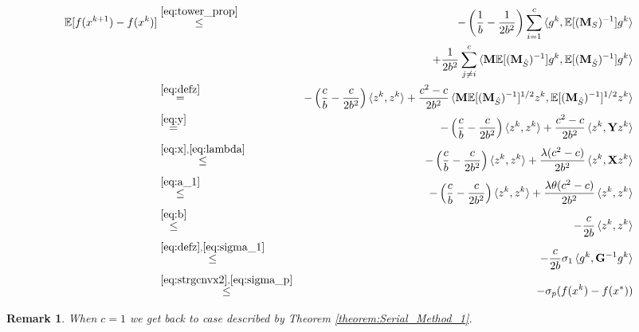 \documentclass[11pt]{article}
\newtheorem{remark}{Remark}
\begin{document}
		\begin{eqnarray}
			\mathbb{E}[f(x^{k+1})-f(x^k)] &\stackrel{\eqref{eq:tower_prop}}\leq & -\left(\frac{1}{b}-\frac{1}{2b^2}\right)\sum_{i=1}^{c}\braket{g^k,\mathbb{E}[(\mathbf{M}_{S})^{-1}
				] g^k} \\ && + \frac{1}{2b^2}\sum_{j\neq i}^{c}\braket{\mathbf{M}\mathbb{E}[(\mathbf{M}_{\hat{S}})^{-1}]g^k,\mathbb{E}[(\mathbf{M}_{\hat{S}})^{-1}
				] g^k} \\
			& \stackrel{\eqref{eq:defz}}= & -\left(\frac{c}{b}-\frac{c}{2b^2}\right)\braket{z^k,z^k}  + \frac{c^2-c}{2b^2}\braket{\mathbf{M}\mathbb{E}[(\mathbf{M}_{\hat{S}})^{-1}]^{1/2} z^k,\mathbb{E}[(\mathbf{M}_{\hat{S}})^{-1}
				]^{1/2} z^k} \notag \\ & \stackrel{\eqref{eq:y}} =  &-\left(\frac{c}{b}-\frac{c}{2b^2}\right)\braket{z^k,z^k}  + \frac{c^2-c}{2b^2}\braket{ z^k,\mathbf{Y} z^k} 
			\\ & \stackrel{\eqref{eq:x},\eqref{eq:lambda}} \leq &-\left(\frac{c}{b}-\frac{c}{2b^2}\right)\braket{z^k,z^k}  + \frac{\lambda(c^2-c)}{2b^2}\braket{ z^k,\mathbf{X} z^k} 
			\\ & \stackrel{\eqref{eq:a_1}} \leq &-\left(\frac{c}{b}-\frac{c}{2b^2}\right)\braket{z^k,z^k}  + \frac{\lambda \theta (c^2-c)}{2b^2}\braket{ z^k, z^k}
			\\ & \stackrel{\eqref{eq:b}} \leq &-\frac{c}{2b}\braket{ z^k, z^k} \label{eq:neededforproof}
			\\ & \stackrel{\eqref{eq:defz},\eqref{eq:sigma_1}} \leq &-\frac{c}{2b} \sigma_1 \braket{ g^k, \mathbf{G}^{-1} g^k}
			\\ & \stackrel{\eqref{eq:strgcnvx2},\eqref{eq:sigma_p}}\leq & -\sigma_p(f(x^k)-f(x^*))
		\end{eqnarray}

	
	
	
	\begin{remark}
		When $c=1$ we get back to case described by Theorem \ref{theorem:Serial_Method_1}.	
	\end{remark}
	
\end{document}
